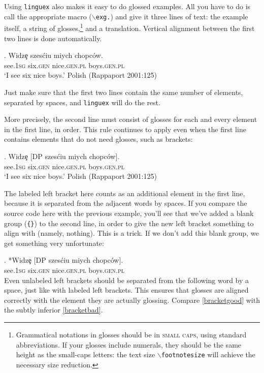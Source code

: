 \documentclass[letterpaper,12pt, twoside]{article}
\begin{document}
Using \texttt{linguex} also makes it easy to do glossed examples. All you have to do is call the appropriate macro (\texttt{$\backslash$exg.}) and give it three lines of text: the example itself, a string of glosses,\footnote{Grammatical notations in glosses should be in \textsc{small caps}, using standard abbreviations. If your glosses include numerals, they should be the same height as the small-caps letters: the text size \texttt{$\backslash$footnotesize} will achieve the necessary size reduction.} and a translation. Vertical alignment between the first two lines is done automatically. 


\exg. Widz\c{e}  szes\'ciu {mi\textltilde ych} {ch\textltilde opc\'ow}. \\ 
see.\textsc{{\footnotesize 1}sg} six.\textsc{gen} nice.\textsc{gen.pl} boys.\textsc{gen.pl} \\ 
 `I see six nice boys.' \hfill  Polish (Rappaport 2001:125)

Just make sure that the first two lines contain the same number of elements, separated by spaces, and \texttt{linguex} will do the rest. 

More precisely, the second line must consist of glosses for each and every element in the first line, in order. This rule continues to apply even when the first line contains elements that do not need glosses, such as brackets:

\exig. Widz\c{e}  [DP szes\'ciu {mi\textltilde ych} {ch\textltilde opc\'ow}]. \\ 
see.\textsc{{\footnotesize 1}sg} {} six.\textsc{gen} nice.\textsc{gen.pl} boys.\textsc{gen.pl} \\ 
 `I see six nice boys.' \hfill  Polish (Rappaport 2001:125)

The labeled left bracket here counts as an additional element in the first line, because it is separated from the adjacent words by spaces. If you compare the source code here with the previous example, you'll see that we've added a blank group (\texttt{\{\}}) to the second line, in order to give the new left bracket something to align with (namely, nothing). This is a trick. If we don't add this blank group, we get something very unfortunate:

\exig. *Widz\c{e}  [DP szes\'ciu {mi\textltilde ych} {ch\textltilde opc\'ow}]. \\ 
see.\textsc{{\footnotesize 1}sg} six.\textsc{gen} nice.\textsc{gen.pl} boys.\textsc{gen.pl} \\
 

Even unlabeled left brackets should be separated from the following word by a space, just like with labeled left brackets. This ensures that glosses are aligned correctly with the element they are actually glossing. Compare \ref{bracketgood} with the subtly inferior \ref{bracketbad}.
\end{document}
